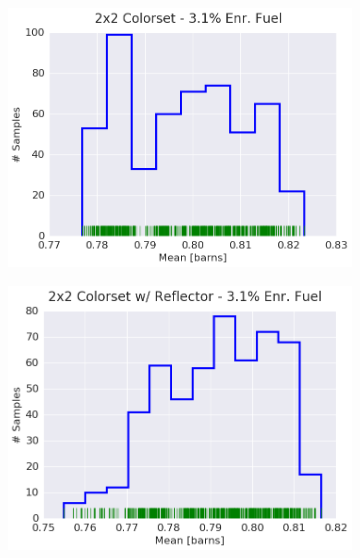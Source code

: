 \begin{figure}[h!]
\begin{subfigure}{0.5\textwidth}
  \centering
  \includegraphics[width=\linewidth]{figures/patterns/2x2/hist-kde-rug/31-enr-capt-1}
  \caption{}
  \label{fig:chap9-hist-2x2-3.1-capt}
\end{subfigure}%
\begin{subfigure}{0.5\textwidth}
  \centering
  \includegraphics[width=\linewidth]{figures/patterns/reflector/hist-kde-rug/31-enr-capt-1}  \caption{}
  \label{fig:chap9-hist-reflector-3.1-capt}
\end{subfigure}
\begin{subfigure}{0.5\textwidth}
  \centering

\end{subfigure}
\end{figure}
